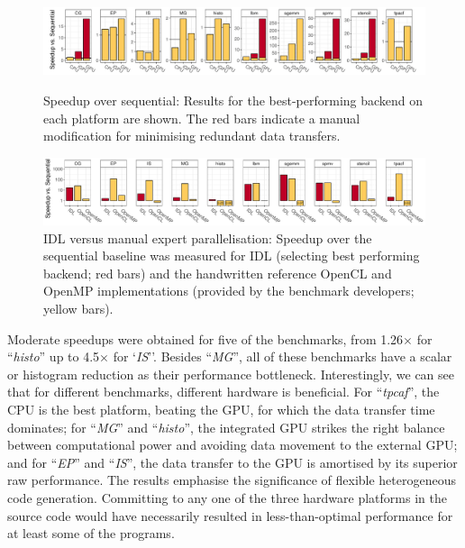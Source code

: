 \begin{figure}[t]
  \centering
  \includegraphics[width=\textwidth]{figures/asplos_speedup.pdf}
  \caption{Speedup over sequential:
           Results for the best-performing backend on each platform are shown.
           The red bars indicate a manual modification for minimising redundant
           data transfers.}
  \label{fig:speedup-figure}
  \vspace{1.5em}
  \centering
  \includegraphics[width=\textwidth]{figures/asplos_comparison.pdf}
  \caption{IDL versus manual expert parallelisation:
           Speedup over the sequential baseline was measured for IDL
           (selecting best performing backend; red bars) and the
           handwritten reference OpenCL and OpenMP implementations
           (provided by the benchmark developers; yellow bars).}
  \label{fig:speedup-figure-2}
  \vspace{0.5em}
\end{figure}

    Moderate speedups were obtained for five of the benchmarks, from
    1.26$\times$ for ``\emph{histo}'' up to 4.5$\times$ for `\emph{IS}''.
    Besides ``\emph{MG}'', all of these benchmarks have a scalar or histogram
    reduction as their performance bottleneck.
    Interestingly, we can see that for different benchmarks, different hardware
    is beneficial.
    For ``\emph{tpcaf}'', the CPU is the best platform, beating the GPU,
    for which the data transfer time dominates;
    for ``\emph{MG}'' and ``\emph{histo}'', the integrated GPU strikes the right
    balance between computational power and avoiding data movement to the
    external GPU;
    and for ``\emph{EP}'' and ``\emph{IS}'', the data transfer to the GPU is
    amortised by its superior raw performance.
    The results emphasise the significance of flexible heterogeneous
    code generation.
    Committing to any one of the three hardware platforms in the source code
    would have necessarily resulted in less-than-optimal performance for at
    least some of the programs.

